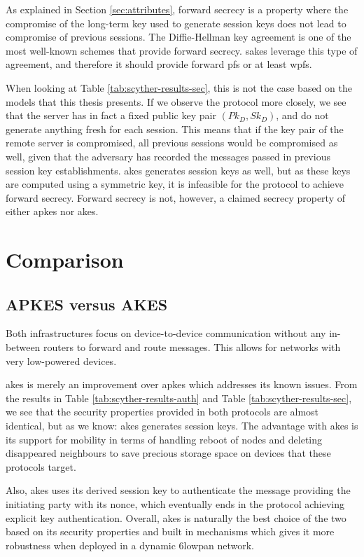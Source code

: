 As explained in Section \ref{sec:attributes}, forward secrecy is a property where the compromise of the long-term key used to generate session keys does not lead to compromise of previous sessions. The Diffie-Hellman key agreement is one of the most well-known schemes that provide forward secrecy. \gls{sakes} leverage this type of agreement, and therefore it should provide forward \gls{pfs} or at least \gls{wpfs}.

When looking at Table \ref{tab:scyther-results-sec}, this is not the case based on the models that this thesis presents. If we observe the protocol more closely, we see that the server has in fact a fixed public key pair $(Pk_D, Sk_D)$, and do not generate anything fresh for each session. This means that if the key pair of the remote server is compromised, all previous sessions would be compromised as well, given that the adversary has recorded the messages passed in previous session key establishments. \gls{akes} generates session keys as well, but as these keys are computed using a symmetric key, it is infeasible for the protocol to achieve forward secrecy. Forward secrecy is not, however, a claimed secrecy property of either \gls{apkes} nor {akes}.


\section{Comparison}

\subsection{APKES versus AKES}

Both infrastructures focus on device-to-device communication without any in-between routers to forward and route messages. This allows for networks with very low-powered devices. 

\gls{akes} is merely an improvement over \gls{apkes} which addresses its known issues. From the results in Table \ref{tab:scyther-results-auth} and Table \ref{tab:scyther-results-sec}, we see that the security properties provided in both protocols are almost identical, but as we know: \gls{akes} generates session keys. The advantage with \gls{akes} is its support for mobility in terms of handling reboot of nodes and deleting disappeared neighbours to save precious storage space on devices that these protocols target.

Also, \gls{akes} uses its derived session key to authenticate the message providing the initiating party with its nonce, which eventually ends in the protocol achieving explicit key authentication. Overall, \gls{akes} is naturally the best choice of the two based on its security properties and built in mechanisms which gives it more robustness when deployed in a dynamic \gls{6lowpan} network.

